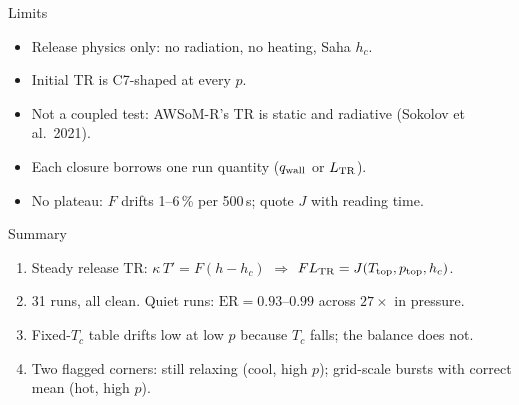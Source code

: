 \documentclass[aspectratio=169,10pt]{beamer}
\newcommand{\ptop}{p_{\rm top}}
\newcommand{\Ttop}{T_{\rm top}}
\newcommand{\qwall}{q_{\rm wall}}
\newcommand{\LTR}{L_{\rm TR}}
\newcommand{\ER}{\mathrm{ER}}
\begin{document}
\begin{frame}{Limits}
  \begin{itemize}\itemsep10pt
    \item Release physics only: no radiation, no heating, Saha $h_c$.
    \item Initial TR is C7-shaped at every $p$.
    \item Not a coupled test: AWSoM-R's TR is static and radiative
          (Sokolov et al.\ 2021).
    \item Each closure borrows one run quantity ($\qwall$ or $\LTR$).
    \item No plateau: $F$ drifts 1--6\,\% per 500\,s; quote $J$ with reading
          time.
  \end{itemize}
\end{frame}

\begin{frame}{Summary}
  \vfill
  \begin{enumerate}\itemsep12pt
    \item Steady release TR: $\kappa\,T' = F(h-h_c)$ $\Rightarrow$
          $F\LTR = J(\Ttop,\ptop,h_c)$.
    \item 31 runs, all clean. Quiet runs: $\ER = 0.93$--$0.99$ across
          $27\times$ in pressure.
    \item Fixed-$T_c$ table drifts low at low $p$ because $T_c$ falls; the
          balance does not.
    \item Two flagged corners: still relaxing (cool, high $p$); grid-scale
          bursts with correct mean (hot, high $p$).
  \end{enumerate}
  \vfill
\end{frame}

\appendix
\end{document}
